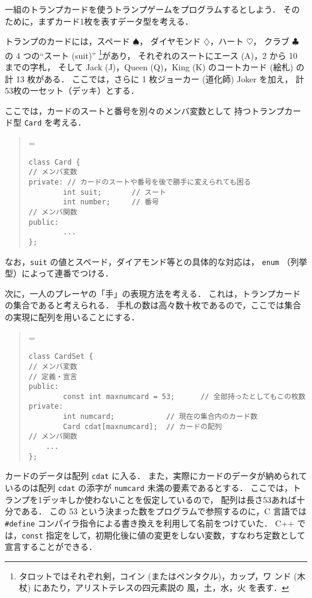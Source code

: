 \documentclass[11pt,a4,epsf]{jarticle}
\def\linesparpage#1{\baselineskip=\textheight\divide\baselineskip#1}
\begin{document}
一組のトランプカードを使うトランプゲームをプログラムするとしよう．
そのために，まずカード1枚を表すデータ型を考える．

トランプのカードには，スペード $\spadesuit$，
ダイヤモンド $\diamondsuit$，ハート $\heartsuit$，
クラブ $\clubsuit$ の 4 つの``スート (suit)''
\footnote{タロットではそれぞれ剣，コイン (またはペンタクル)，カップ，ワ
ンド (木杖) にあたり，アリストテレスの四元素説の 風，土，水，火 を表す．}があり，
それぞれのスートにエース (A)，2 から 10 までの字札，
そして Jack (J)，Queen (Q)，King (K) のコートカード (絵札) の
計 13 枚がある．
ここでは，さらに 1 枚ジョーカー (道化師) Joker を加え，
計53枚の一セット（デッキ）とする．

ここでは，カードのスートと番号を別々のメンバ変数として
持つトランプカード型 \verb+Card+ を考える．
\begin{quote}
\linesparpage{50}
\begin{verbatim}
class Card {
// メンバ変数
private: // カードのスートや番号を後で勝手に変えられても困る
        int suit;       // スート
        int number;     // 番号
// メンバ関数
public:
        ...
};
\end{verbatim}
\end{quote}
なお，\verb+suit+ の値とスペード，ダイアモンド等との具体的な対応は，
\verb+enum+ （列挙型）によって連番でつける．

次に，一人のプレーヤの「手」の表現方法を考える．
これは，トランプカードの集合であると考えられる．
手札の数は高々数十枚であるので，ここでは集合の実現に配列を用いることにする．
\begin{quote}
\linesparpage{50}
\begin{verbatim}
class CardSet {
// メンバ変数
// 定義・宣言
public:
        const int maxnumcard = 53;      // 全部持ったとしてもこの枚数
private:
        int numcard;            // 現在の集合内のカード数
        Card cdat[maxnumcard];  // カードの配列
// メンバ関数
	...
};
\end{verbatim}
\end{quote}
カードのデータは配列 \verb+cdat+ に入る．
また，実際にカードのデータが納められているのは配列 \verb+cdat+ の添字が  \verb+numcard+ 未満の要素であるとする．
ここでは，トランプを1デッキしか使わないことを仮定しているので，
配列は長さ53あれば十分である．
この 53 という決まった数をプログラムで参照するのに，C 言語では
\verb+#define+ コンパイラ指令による書き換えを利用して名前をつけていた．
C++ では，\verb+const+ 指定をして，初期化後に値の変更をしない変数，すなわち定数として宣言することができる．
\end{document}
